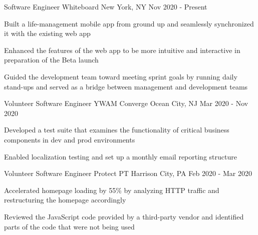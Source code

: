 

\begin{cventries}

\cventry
  {Software Engineer} %
  {Whiteboard} %
  {New York, NY} %
  {Nov 2020 - Present} %
  {
    \begin{cvitems} %
      \item {Built a life-management mobile app from ground up and seamlessly synchronized it with the existing web app}
      \item {Enhanced the features of the web app to be more intuitive and interactive in preparation of the Beta launch}
      \item {Guided the development team toward meeting sprint goals by running daily stand-ups and served as a bridge between management and development teams}
    \end{cvitems}
  }

\cventry
  {Volunteer Software Engineer} %
  {YWAM Converge} %
  {Ocean City, NJ} %
  {Mar 2020 - Nov 2020} %
  {
    \begin{cvitems} %
      \item {Developed a test suite that examines the functionality of critical business components in dev and prod environments}
      \item {Enabled localization testing and set up a monthly email reporting structure}
    \end{cvitems}
  }

\cventry
  {Volunteer Software Engineer} %
  {Protect PT} %
  {Harrison City, PA} %
  {Feb 2020 - Mar 2020} %
  {
    \begin{cvitems} %
      \item {Accelerated homepage loading by 55\% by analyzing HTTP traffic and restructuring the homepage accordingly}
      \item {Reviewed the JavaScript code provided by a third-party vendor and identified parts of the code that were not being used}
    \end{cvitems}
  }


\end{cventries}
